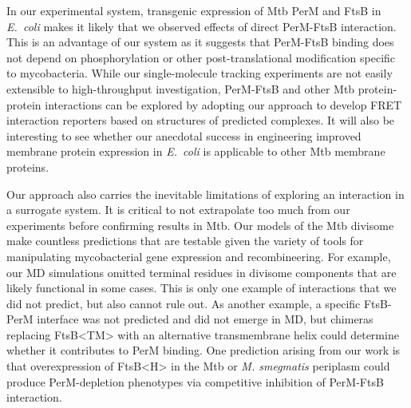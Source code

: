 \documentclass[twocolumn,pdflatex,sn-nature]{sn-jnl}%
\def\textsuperscript#1{<#1>}%
\newcommand\ec{\textit{E.~coli}}
\newcommand\mtb{Mtb}
\newcommand\msmeg{\textit{M. smegmatis}}
\newcommand\ftsbTM{FtsB\textsuperscript{TM}}
\newcommand\ftsbH{FtsB\textsuperscript{H}}
\begin{document}
In our experimental system, transgenic expression of \mtb{} PerM and FtsB in \ec{} makes it likely that we observed effects of direct PerM-FtsB interaction.
This is an advantage of our system as it suggests that PerM-FtsB binding does not depend on phosphorylation or other post-translational modification specific to mycobacteria.
While our single-molecule tracking experiments are not easily extensible to high-throughput investigation, PerM-FtsB and other \mtb{} protein-protein interactions can be explored by adopting our approach to develop FRET interaction reporters based on structures of predicted complexes.
It will also be interesting to see whether our anecdotal success in engineering improved membrane protein expression in \ec{} is applicable to other \mtb{} membrane proteins.

Our approach also carries the inevitable limitations of exploring an interaction in a surrogate system.
It is critical to not extrapolate too much from our experiments before confirming results in \mtb{}.
Our models of the \mtb{} divisome make countless predictions that are testable given the variety of tools for manipulating mycobacterial gene expression and recombineering.
For example, our MD simulations omitted terminal residues in divisome components that are likely functional in some cases.
This is only one example of interactions that we did not predict, but also cannot rule out.
As another example, a specific FtsB-PerM interface was not predicted and did not emerge in MD, but chimeras replacing \ftsbTM{} with an alternative transmembrane helix could determine whether it contributes to PerM binding.
One prediction arising from our work is that overexpression of \ftsbH{} in the \mtb{} or \msmeg{} periplasm could produce PerM-depletion phenotypes \citep{wangPersistentMycobacteriumTuberculosis2019} via competitive inhibition of PerM-FtsB interaction.
\end{document}
